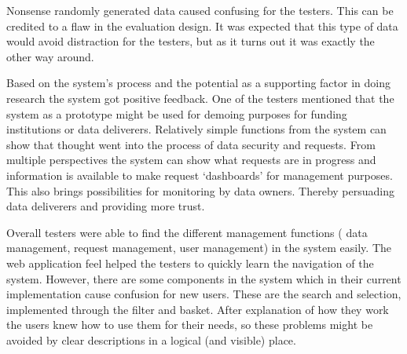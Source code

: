 Nonsense randomly generated data caused confusing for the testers.
This can be credited to a flaw in the evaluation design.
It was expected that this type of data would avoid distraction for the testers, but as it turns out it was exactly the other way around.

Based on the system's process and the potential as a supporting factor in doing research the system got positive feedback.
One of the testers mentioned that the system as a prototype might be used for demoing purposes for funding institutions or data deliverers.
Relatively simple functions from the system can show that thought went into the process of data security and requests.
From multiple perspectives the system can show what requests are in progress and information is available to make request `dashboards' for management purposes.
This also brings possibilities for monitoring by data owners.
Thereby persuading data deliverers and providing more trust.

Overall testers were able to find the different management functions (\ie{} data management, request management, user management) in the system easily.
The web application feel helped the testers to quickly learn the navigation of the system.
However, there are some components in the system which in their current implementation cause confusion for new users.
These are the search and selection, implemented through the filter and basket.
After explanation of how they work the users knew how to use them for their needs, so these problems might be avoided by clear descriptions in a logical (and visible) place.
